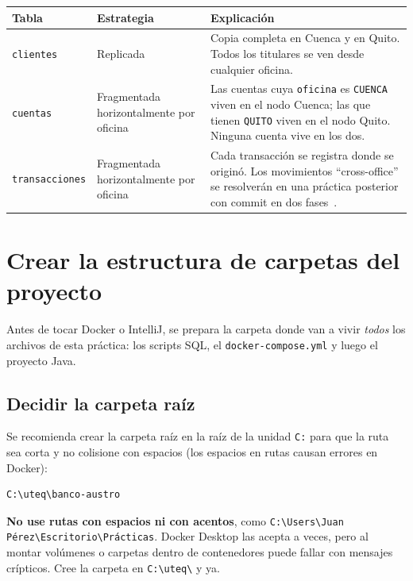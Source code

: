 \documentclass[11pt,a4paper]{article}
\begin{document}
\begin{xltabular}{\textwidth}{@{}p{2.7cm}p{2.7cm}X@{}}
\toprule
\textbf{Tabla} & \textbf{Estrategia} & \textbf{Explicaci\'on} \\
\midrule
\texttt{clientes}       & Replicada        & Copia completa en Cuenca y en Quito. Todos los titulares se ven desde cualquier oficina. \\
\texttt{cuentas}        & Fragmentada horizontalmente por oficina & Las cuentas cuya \texttt{oficina} es \texttt{CUENCA} viven en el nodo Cuenca; las que tienen \texttt{QUITO} viven en el nodo Quito. Ninguna cuenta vive en los dos. \\
\texttt{transacciones}  & Fragmentada horizontalmente por oficina & Cada transacci\'on se registra donde se origin\'o. Los movimientos ``cross-office'' se resolver\'an en una pr\'actica posterior con commit en dos fases~\cite{Gray1993Transaction}. \\
\bottomrule
\end{xltabular}

\clearpage
\section{Crear la estructura de carpetas del proyecto}

Antes de tocar Docker o IntelliJ, se prepara la carpeta donde van a vivir \emph{todos} los archivos de esta pr\'actica: los scripts SQL, el \texttt{docker-compose.yml} y luego el proyecto Java.

\subsection{Decidir la carpeta ra\'iz}

Se recomienda crear la carpeta ra\'iz en la ra\'iz de la unidad \texttt{C:} para que la ruta sea corta y no colisione con espacios (los espacios en rutas causan errores en Docker):

\begin{lstlisting}[style=bashstyle]
C:\uteq\banco-austro
\end{lstlisting}

\begin{errorbox}
\textbf{No use rutas con espacios ni con acentos}, como \texttt{C:\textbackslash Users\textbackslash Juan P\'erez\textbackslash Escritorio\textbackslash Pr\'acticas}. Docker Desktop las acepta a veces, pero al montar vol\'umenes o carpetas dentro de contenedores puede fallar con mensajes crípticos. Cree la carpeta en \texttt{C:\textbackslash uteq\textbackslash} y ya.
\end{errorbox}
\end{document}
